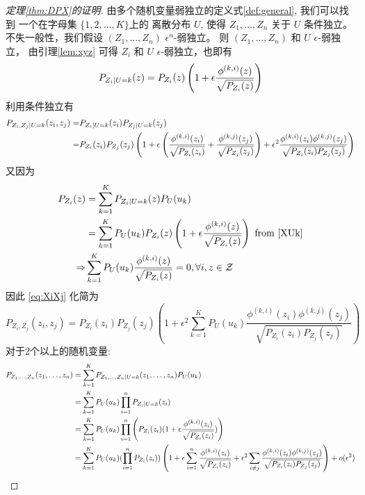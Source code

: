 \begin{proof}[定理\ref{thm:DPX}的证明]
  由多个随机变量弱独立的定义式\ref{def:general},
  我们可以找到 一个在字母集 $\{1, 2,\dots, K\}$上的
  离散分布 $U$, 使得 $Z_1, \dots, Z_n$
  关于 $U$ 条件独立。不失一般性，我们假设
  $(Z_1, \dots, Z_n)$ $\epsilon^n$-弱独立。
  则 $(Z_1, \dots, Z_n)$ 和 $U$ $\epsilon$-弱独立，
  由引理\ref{lem:xyz} 可得 $Z_i$
  和 $U$ $\epsilon$-弱独立，也即有 
\begin{equation}\label{XUk}
P_{Z_i | U=k}(z) = P_{Z_i} (z) \left( 1 + \epsilon {\phi^{(k,i)}(z) \over \sqrt{P_{Z_i}(z)}} \right)
\end{equation}
利用条件独立有
\begin{align}
P_{Z_i, Z_j | U = k}(z_i, z_j)
=& P_{Z_i | U=k}(z_i)
P_{Z_j | U=k}(z_j) \notag \\
=& P_{Z_i}(z_i)P_{Z_j}(z_j)
\left(1 + \epsilon
\left(\frac{\phi^{(k,i)}(z_i)}{\sqrt{P_{Z_i}(z_i)}}
+ \frac{\phi^{(k,j)}(z_j)}{\sqrt{P_{Z_j}(z_j)}}
\right) +
\epsilon^2\frac{\phi^{(k,i)}(z_i)
	\phi^{(k,j)}(z_j)}{\sqrt{P_{Z_i}(z_i)P_{Z_j}(z_j)}}
  \right)
  \label{eq:XiXj}
\end{align}
又因为
\begin{align*}
P_{Z_i}(z) &= \sum_{k=1}^{K} P_{Z_i | U=k}(z) P_U(u_k) \\
& =  \sum_{k=1}^{K}P_U(u_k)P_{Z_i} (z)
\left( 1 + \epsilon {\phi^{(k,i)}(z) \over \sqrt{P_{Z_i}(z)}} 
\right) \textrm{ from } \eqref{XUk}\\
\Rightarrow & \sum_{k=1}^{K} P_U(u_k){\phi^{(k, i)}(z) \over \sqrt{P_{Z_i}(z)}} =0,\forall i, z\in \mathcal{Z}
\end{align*}
因此 \eqref{eq:XiXj} 化简为
\begin{equation}\label{eq:PXiXj}
P_{Z_i, Z_j}(z_i, z_j) = P_{Z_i}(z_i)
P_{Z_j}(z_j) \left(
  1+\epsilon^2 \sum_{k=1}^K P_U(u_k)
\frac{\phi^{(k,i)}(z_i)
	\phi^{(k,j)}(z_j)}{\sqrt{P_{Z_i}(z_i)P_{Z_j}(z_j)}}
  \right)
\end{equation}
对于2个以上的随机变量:
\begin{align*}
P_{Z_1,\dots,Z_n}(z_1,\dots,z_n)  &= \sum_{k=1}^{K} P_{Z_1,\dots,Z_n | U=k}(z_1,\dots,z_n) P_U(u_k) \\
&=  \sum_{k=1}^{K}P_U(u_k) \prod_{i=1}^n P_{Z_i|U=k}(z_i)\\
&= \sum_{k=1}^{K} P_U(u_k)\prod_{i=1}^n \left(P_{Z_i} (z_i)( 1 + \epsilon {\phi^{(k,i)}(z_i ) \over \sqrt{P_{Z_i}(z_i)}} )\right)\\
&=  \sum_{k=1}^{K}P_U(u_k) (\prod_{i=1}^n  P_{Z_i} (z_i))
\left( 1 + \epsilon\sum_{i=1}^n {\phi^{(k,i)}(z_i) \over \sqrt{P_{Z_i}(z_i)}} + \epsilon^2\sum_{i\neq j}{\phi^{(k,i)}(z_i)\phi^{(k,j)}(z_j)\over \sqrt{P_{Z_i}(z_i)P_{Z_j}(z_j)} }\right)+o(\epsilon^2) \\

\end{align*}
\end{proof}

